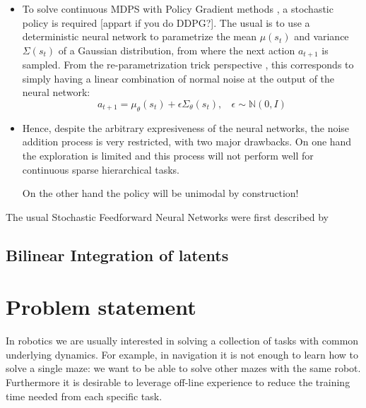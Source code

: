 \documentclass{article} %
\begin{document}
\begin{itemize}
    \item To solve continuous MDPS with Policy Gradient methods \citep{peters2008reinforcement}, a stochastic policy is required [appart if you do DDPG?]. The usual is to use a deterministic neural network to parametrize the mean $\mu(s_t)$ and variance $\Sigma(s_t)$ of a Gaussian distribution, from where the next action $a_{t+1}$ is sampled. From the re-parametrization trick perspective \citep{look at SVG paper or DeepMind-modulate}, this corresponds to simply having a linear combination of normal noise at the output of the neural network:
    \begin{equation}
        a_{t+1} = \mu_{\theta}(s_t) +\epsilon \Sigma_\theta(s_t), ~~~~ \epsilon \sim \mathbb{N}(0,I)
    \end{equation}
    \item Hence, despite the arbitrary expresiveness of the neural networks, the noise addition process is very restricted, with two major drawbacks. On one hand the exploration is limited and this process will not perform well for continuous sparse hierarchical tasks. 
    
    On the other hand the policy will be unimodal by construction!
\end{itemize}
The usual Stochastic Feedforward Neural Networks were first described by \citet{tang2013sfnn}

\subsection{Bilinear Integration of latents}

\section{Problem statement}
In robotics we are usually interested in solving a collection of tasks with common underlying dynamics. For example, in navigation it is not enough to learn how to solve a single maze: we want to be able to solve other mazes with the same robot. Furthermore it is desirable to leverage off-line experience to reduce the training time needed from each specific task. 
\end{document}

